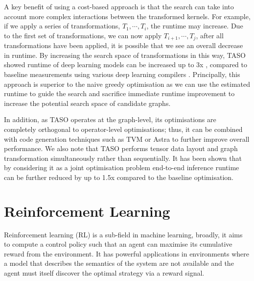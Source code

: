 

A key benefit of using a cost-based approach is that the search can take into account more complex interactions between the transformed kernels. For example, if we apply a series of transformations, $T_1, \cdots, T_i$, the runtime may increase. Due to the first set of transformations, we can now apply $T_{i + 1}, \cdots, T_{j}$, after all transformations have been applied, it is possible that we see an overall decrease in runtime. By increasing the search space of transformations in this way, TASO showed runtime of deep learning models can be increased up to 3x \cite{jia2019taso, jia2019optimizing}, compared to baseline measurements using various deep learning compilers \cite{ chetlur2014cudnn, cublas2008, tensorrt2017}. Principally, this approach is superior to the naive greedy optimisation as we can use the estimated runtime to guide the search and sacrifice immediate runtime improvement to increase the potential search space of candidate graphs.


In addition, as TASO operates at the graph-level, its optimisations are completely orthogonal to operator-level optimisations; thus, it can be combined with code generation techniques such as TVM \cite{chen2018tvm} or Astra \cite{sivathanu2019astra} to further improve overall performance. We also note that TASO performs tensor data layout and graph transformation simultaneously rather than sequentially. It has been shown that by considering it as a joint optimisation problem end-to-end inference runtime can be further reduced by up to 1.5x \cite{jia2019taso, jia2019optimizing} compared to the baseline optimisation.


\section{Reinforcement Learning}
Reinforcement learning (RL) is a sub-field in machine learning, broadly, it aims to compute a control policy such that an agent can maximise its cumulative reward from the environment. It has powerful applications in environments where a model that describes the semantics of the system are not available and the agent must itself discover the optimal strategy via a reward signal.

